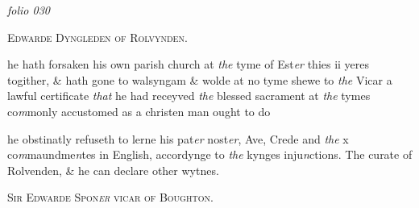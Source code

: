 \documentclass[12pt, a4paper]{book}
\begin{document}
\textit{folio 030}


            
               
				\begin{center} \begin{large} {\scshape Edwarde Dyngleden of Rolvynden.} \end{large} \end{center}
			

            	
            		
				\marginpar[\vspace{0.5cm}{\textcolor{Gray}{pilgrimages}}]{}
			
            		
				\marginpar[\vspace{0.5cm}{\textcolor{Gray}{n}}]{}
			
            		
		\ifthenelse{\isodd{\thepage}}
		{\reversemarginpar}
		{\normalmarginpar}
		 he hath forsaken his own parish church at \textit{the} tyme of
 Est\textit{er} thies ii yeres togither, \& hath gone to walsyngam
 \& wolde at no tyme shewe to \textit{the} Vicar a lawful certificate \textit{that} he had receyved \textit{the} blessed sacrament at \textit{the}
 tymes co\textit{m}monly accustomed as a christen man ought to do
	
		
			
		
		\ifthenelse{\isodd{\thepage}}
		{\reversemarginpar}
		{\normalmarginpar}
		he obstinatly refuseth to lerne his pat\textit{er} nost\textit{er}, Ave, Crede and
 \textit{the} x co\textit{m}maundme\textit{n}tes in English, accordynge to \textit{the} kynges
 inju\textit{n}ctions. The curate of Rolvenden, \& he can declare other wytnes.
	
 

            
               
				\begin{center} \begin{large} {\scshape Sir Edwarde Spon\textit{er} vicar of Boughton.} \end{large} \end{center}
			


				\marginpar[\vspace{0.5cm}{\textcolor{Gray}{ceremonies}}]{}
			
				\marginpar[\vspace{0.5cm}{\textcolor{Gray}{n}}]{}
			
\end{document}
